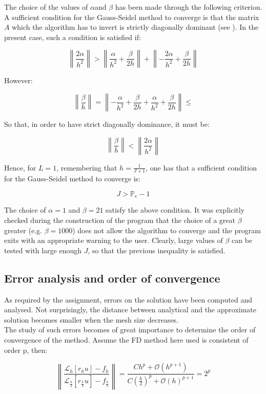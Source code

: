 \documentclass[11pt]{article}
\theoremstyle{theorem}
\theoremstyle{definition}
\begin{document}
The choice of the values of $\alpha$and $\beta$ has been made through the following criterion.\\
A sufficient condition for the Gauss-Seidel method to converge is that the matrix $A$ which the algorithm has to invert is strictly diagonally dominant (see \cite{numerical-math}). In the present case, such a condition is satisfied if:

$$\left\|\frac{2\alpha}{h^2}\right\|> \left\|\frac{\alpha}{h^2}+\frac{\beta}{2h}\right\| + \left\|-\frac{2\alpha}{h^2}+\frac{\beta}{2h}\right\|$$

However:

$$\left\|\frac{\beta}{h}\right\|= \left\|-\frac{\alpha}{h^2}+\frac{\beta}{2h}+\frac{\alpha}{h^2}+\frac{\beta}{2h}\right\|\le $$

So that, in order to have strict diagonally dominance, it must be:

$$\left\|\frac{\beta}{h}\right\|<\left\|\frac{2\alpha}{h^2}\right\|$$

Hence, for $L=1$, remembering that $h=\frac{1}{J+1}$, one has that a sufficient condition for the Gauss-Seidel method to converge is:

$$J>\mathbb{P}_e-1$$

The choice of $\alpha=1$ and $\beta=21$ satisfy the above condition. It was explicitly checked during the construction of the program that the choice of a great $\beta$ greater (e.g. $\beta=1000$) does not allow the algorithm to converge and the program exits with an appropriate warning to the user. Clearly, large values of $\beta$ can be tested with large enough $J$, so that the previous inequality is satisfied.\\

\subsection{Error analysis and order of convergence}
As required by the assignment, errors on the solution have been computed and analysed. Not surprisingly, the distance between analytical and the approximate solution becomes smaller when the mesh size decreases.\\
The study of such errors becomes of great importance to determine the order of convergence of the method. Assume the FD method here used is consistent of order p, then:

$$\left\|\frac{\mathcal{L}_h[r_hu]-f_h}{\mathcal{L}_{\frac{h}{2}}\left[r_\frac{h}{2}u\right]-f_\frac{h}{2}}\right\|=\frac{Ch^p+\mathcal{O}(h^{p+1})}{C\left(\frac{h}{2}\right)^p+\mathcal{O}(h)^{p+1}}=2^p$$
\end{document}
